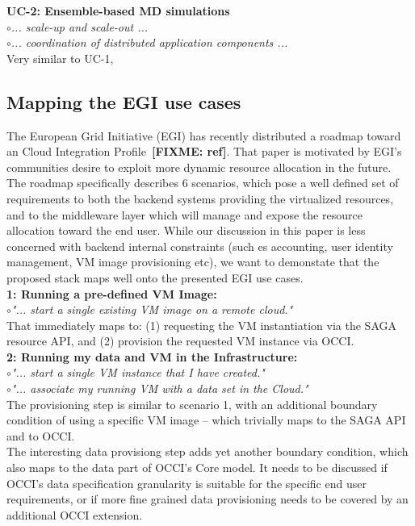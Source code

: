 \documentclass[10pt,conference,final,letterpaper,twoside,twocolumn,]{IEEEtran}
\newcommand{\I}[1]{\textit{#1}}
\newcommand{\B}[1]{\textbf{#1}}
\newcommand{\F}[1]{\B{[FIXME: #1]}}
\newcommand{\bull}{$\circ$}
\begin{document}
 \noindent
 \B{UC-2: Ensemble-based MD simulations}\\
 \bull \I{... scale-up and scale-out ... }\\
 \bull \I{... coordination of distributed application components ... }\\
 Very similar to UC-1, 

 \subsection{Mapping the EGI use cases}

 The European Grid Initiative (EGI) has recently distributed a roadmap
 toward an Cloud Integration Profile~\F{ref}.  That paper is motivated
 by EGI's communities desire to exploit more dynamic resource
 allocation in the future.  The roadmap specifically describes 6
 scenarios, which pose a well defined set of requirements to both the
 backend systems providing the virtualized resources, and to the
 middleware layer which will manage and expose the resource
 allocation toward the end user.  While our discussion in this paper
 is less concerned with backend internal constraints (such es
 accounting, user identity management, VM image provisioning etc), we
 want to demonstate that the proposed stack maps well onto the
 presented EGI use cases.\\


  \noindent
  \B{1: Running a pre-defined VM Image:}\\
  \bull \I{"... start a single existing VM image on a remote cloud."}\\
  That immediately maps to: (1) requesting the VM instantiation via
  the SAGA resource API, and (2) provision the requested VM instance
  via OCCI.\\

  \noindent
  \B{2: Running my data and VM in the Infrastructure:}\\
  \bull \I{"... start a single VM instance that I have created."}\\
  \bull \I{"... associate my running VM with a data set in the Cloud."}\\
  The provisioning step is similar to scenario 1, with an additional
  boundary condition of using a specific VM image -- which trivially
  maps to the SAGA API and to OCCI.\\
  The interesting data provisiong step adds yet another boundary
  condition, which also maps to the data part of OCCI's Core model.
  It needs to be discussed if OCCI's data specification granularity
  is suitable for the specific end user requirements, or if more fine
  grained data provisioning needs to be covered by an additional OCCI
  extension.
\end{document}
